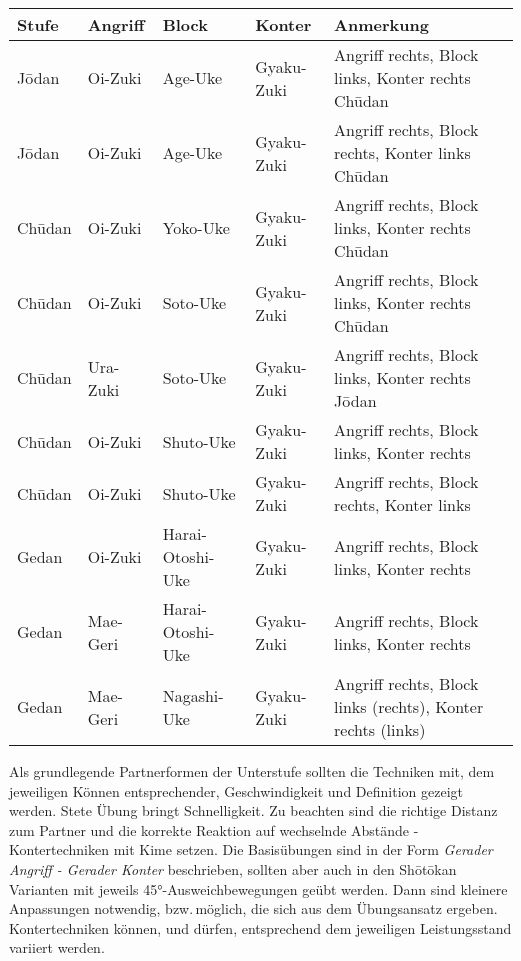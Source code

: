 \setcounter{num}{0}
\setcounter{numz}{0}
\begin{tcolorbox}[width=\textwidth,height=\textheight,right=12pt,left=12pt,colframe=GKD,colback=white,fonttitle=\bfseries,coltitle=white,title=Kihon Ippon Kumite]
	\null\vfill\null
	{\small 	\begin{tabularx}{\textwidth}{llllX}
			\textbf{Stufe} 	& \textbf{Angriff} 	& \textbf{Block}&\textbf{Konter}&Anmerkung\\
			\midrule
			J\={o}dan 	& Oi-Zuki 	& Age-Uke			&Gyaku-Zuki	& Angriff rechts, Block links, Konter rechts Ch\={u}dan \\
			J\={o}dan 	& Oi-Zuki 	& Age-Uke			&Gyaku-Zuki	& Angriff rechts, Block rechts, Konter links Ch\={u}dan \\	
			Ch\={u}dan	& Oi-Zuki	& Yoko-Uke			&Gyaku-Zuki	& Angriff rechts, Block links, Konter rechts Ch\={u}dan \\
			Ch\={u}dan	& Oi-Zuki	& Soto-Uke			&Gyaku-Zuki	& Angriff rechts, Block links, Konter rechts Ch\={u}dan \\
			Ch\={u}dan	& Ura-Zuki	& Soto-Uke			&Gyaku-Zuki	& Angriff rechts, Block links, Konter rechts J\={o}dan \\
			Ch\={u}dan	& Oi-Zuki	& Shuto-Uke			&Gyaku-Zuki	& Angriff rechts, Block links, Konter rechts \\
			Ch\={u}dan	& Oi-Zuki	& Shuto-Uke			&Gyaku-Zuki	& Angriff rechts, Block rechts, Konter links \\
			Gedan		& Oi-Zuki	& Harai-Otoshi-Uke	&Gyaku-Zuki	& Angriff rechts, Block links, Konter rechts  \\
			Gedan		& Mae-Geri	& Harai-Otoshi-Uke	&Gyaku-Zuki	& Angriff rechts, Block links, Konter rechts \\
			Gedan		& Mae-Geri	& Nagashi-Uke		&Gyaku-Zuki	& Angriff rechts, Block links (rechts), Konter rechts (links)\\
			\midrule
	\end{tabularx}}\null\vfill\null
		\begin{center}
			\begin{minipage}[t]{\textwidth-2\tabcolsep}
			{\footnotesize Als grundlegende Partnerformen der Unterstufe sollten die Techniken mit, dem jeweiligen Können entsprechender, Geschwindigkeit und Definition gezeigt werden. Stete Übung bringt Schnelligkeit. Zu beachten sind die richtige Distanz zum Partner und die korrekte Reaktion auf wechselnde Abstände - Kontertechniken mit Kime setzen. Die Basisübungen sind in der Form \textit{Gerader Angriff - Gerader Konter} beschrieben, sollten aber auch in den Sh\={o}t\={o}kan Varianten mit jeweils 45°-Ausweichbewegungen geübt werden. Dann sind kleinere Anpassungen notwendig, bzw.\,möglich, die sich aus dem Übungsansatz ergeben. Kontertechniken können, und dürfen, entsprechend dem jeweiligen Leistungsstand variiert werden.}\onehalfspacing\singlespacing

\end{minipage}
\end{center}
\end{tcolorbox}

